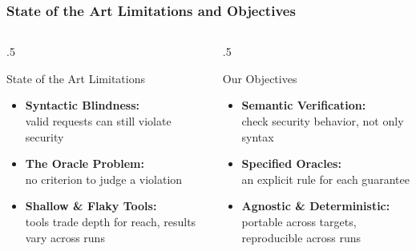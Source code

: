 \begin{frame}
    \frametitle{State of the Art Limitations and Objectives}

    \begin{columns}[T]
        \begin{column}{.5\textwidth}
            \begin{block}{State of the Art Limitations}
                \begin{itemize}
                    \item<1-> \textbf{Syntactic Blindness:} \\
                          valid requests can still violate security
                    \item<2-> \textbf{The Oracle Problem:} \\
                          no criterion to judge a violation
                    \item<3-> \textbf{Shallow \& Flaky Tools:} \\
                          tools trade depth for reach, results vary across runs
                \end{itemize}
            \end{block}
        \end{column}

        \begin{column}{.5\textwidth}
            \begin{block}{Our Objectives}
                \begin{itemize}
                    \item<1-> \textbf{Semantic Verification:} \\
                          check security \alert{behavior}, not only syntax
                    \item<2-> \textbf{Specified Oracles:} \\
                          an \alert{explicit rule} for each guarantee
                    \item<3-> \textbf{Agnostic \& Deterministic:} \\
                          \alert{portable} across targets, \alert{reproducible} across runs
                \end{itemize}
            \end{block}
        \end{column}

    \end{columns}

\end{frame}
